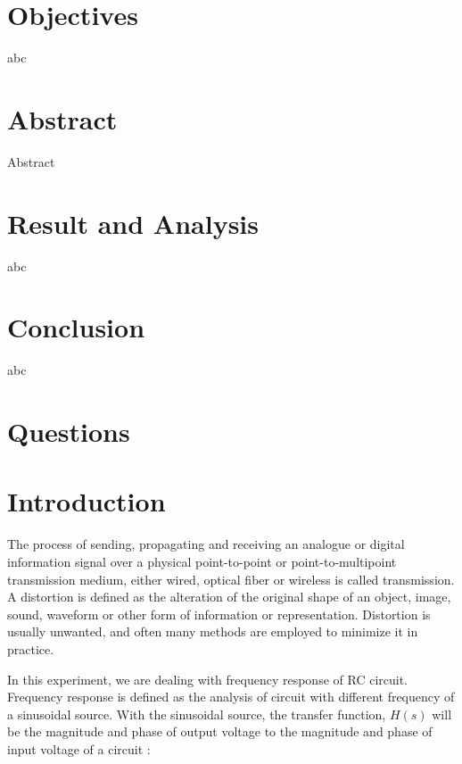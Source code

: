 \documentclass[a4paper, 12pt, english]{article}
\begin{document}


\newpage
\section{Objectives}
abc

\section{Abstract}
Abstract

\section{Result and Analysis}
abc

\section{Conclusion}
abc

\section{Questions}

\section{Introduction}
The process of sending, propagating and receiving an analogue or digital
information signal over a physical point-to-point or point-to-multipoint
transmission medium, either wired, optical fiber or wireless is called
transmission. A distortion is defined as the alteration of the original shape
of an object, image, sound, waveform or other form of information or
representation. Distortion is usually unwanted, and often many methods are
employed to minimize it in practice. \newline

In this experiment, we are dealing with frequency response of RC circuit.
Frequency response is defined as the analysis of circuit with different
frequency of a sinusoidal source. With the sinusoidal source, the transfer
function, $H(s)$ will be the magnitude and phase of output voltage to the
magnitude and phase of input voltage of a circuit :
\end{document}
